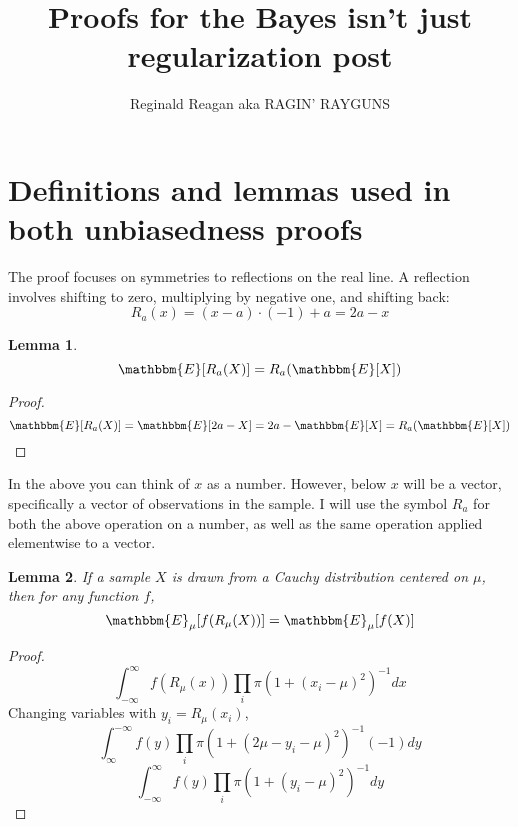 \documentclass{article}
\newtheorem{lemma}{Lemma}
\newcommand{\expec}[1]{\mathbbm{E}[#1]}
\newcommand{\condexp}[2]{\mathbbm{E}_{#1}[#2]}
\begin{document}
\title{Proofs for the Bayes isn't just regularization post}
\author{Reginald Reagan aka RAGIN' RAYGUNS}
\maketitle

\tableofcontents

\section{Definitions and lemmas used in both unbiasedness proofs}
The proof focuses on symmetries to reflections on the real line. A reflection involves shifting to zero, multiplying by negative one, and shifting back:
$$R_a(x) = (x-a) \cdot (-1) + a = 2a-x$$
\begin{lemma}$$\expec{R_a(X)} = R_a(\expec{X})$$\end{lemma}
\begin{proof}
$$\expec{R_a(X)} = \expec{2a-X} = 2a - \expec{X} = R_a(\expec{X})$$
\end{proof}

In the above you can think of $x$ as a number. However, below $x$ will be a vector, specifically a vector of observations in the sample. I will use the symbol $R_a$ for both the above operation on a number, as well as the same operation applied elementwise to a vector.

\begin{lemma}{If a sample $X$ is drawn from a Cauchy distribution centered on $\mu$, then for any function $f$, $$\condexp{\mu}{f(R_\mu(X))} = \condexp{\mu}{f(X)}$$}\end{lemma}
\begin{proof}
$$\int_{-\infty}^\infty f(R_\mu(x)) \prod_i \pi (1 + (x_i-\mu)^2)^{-1} dx$$
Changing variables with $y_i=R_\mu(x_i)$,
$$\int_{\infty}^{-\infty} f(y) \prod_i \pi (1 + (2\mu - y_i - \mu)^2)^{-1} (-1) dy$$
$$\int_{-\infty}^{\infty} f(y) \prod_i \pi (1 + (y_i - \mu)^2)^{-1} dy$$
\end{proof}
\end{document}
